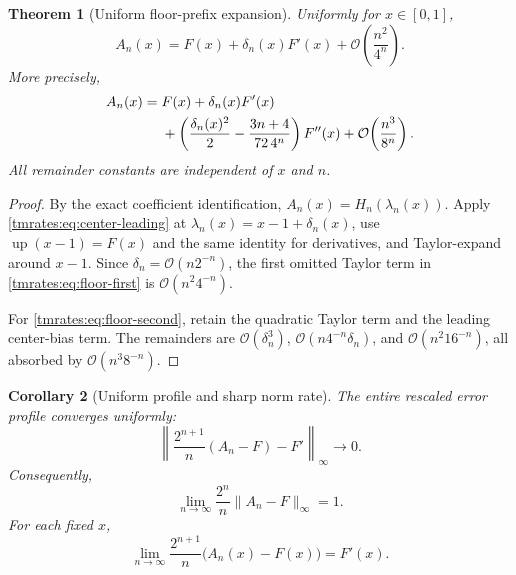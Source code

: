 \documentclass[11pt,oneside]{article}
\newtheorem{theorem}{Theorem}[section]
\newtheorem{corollary}[theorem]{Corollary}
\theoremstyle{definition}
\theoremstyle{remark}
\newcommand{\Up}{\operatorname{up}}
\newcommand{\bigO}{\mathcal O}
\begin{document}
\begin{theorem}[Uniform floor-prefix expansion]
\label{tmrates:thm:floor-expansion}
Uniformly for $x\in[0,1]$,
\begin{equation}
 A_n(x)
 =F(x)+\delta_n(x)F'(x)
  +\bigO\!\left(\frac{n^2}{4^n}\right).                  \label{tmrates:eq:floor-first}
\end{equation}
More precisely,
\begin{align}
 A_n(x)
={}&F(x)+\delta_n(x)F'(x) \notag\\
 &+\left(
    \frac{\delta_n(x)^2}{2}
    -\frac{3n+4}{72\,4^n}
   \right)F''(x)
 +\bigO\!\left(\frac{n^3}{8^n}\right).                  \label{tmrates:eq:floor-second}
\end{align}
All remainder constants are independent of $x$ and $n$.
\end{theorem}

\begin{proof}
By the exact coefficient identification,
$A_n(x)=H_n(\lambda_n(x))$.  Apply \eqref{tmrates:eq:center-leading} at
$\lambda_n(x)=x-1+\delta_n(x)$, use $\Up(x-1)=F(x)$ and the same identity for derivatives,
and Taylor-expand around $x-1$.  Since $\delta_n=\bigO(n2^{-n})$, the first omitted Taylor
term in \eqref{tmrates:eq:floor-first} is $\bigO(n^2 4^{-n})$.

For \eqref{tmrates:eq:floor-second}, retain the quadratic Taylor term and the leading center-bias
term.  The remainders are
$\bigO(\delta_n^3)$, $\bigO(n4^{-n}\delta_n)$, and
$\bigO(n^2 16^{-n})$, all absorbed by $\bigO(n^3 8^{-n})$.
\end{proof}

\begin{corollary}[Uniform profile and sharp norm rate]
\label{tmrates:cor:floor-sharp}
The entire rescaled error profile converges uniformly:
\begin{equation}
 \left\|\frac{2^{n+1}}n(A_n-F)-F'\right\|_\infty
 \longrightarrow0.                                       \label{tmrates:eq:floor-profile}
\end{equation}
Consequently,
\begin{equation}
 \lim_{n\to\infty}\frac{2^n}{n}\|A_n-F\|_\infty=1.       \label{tmrates:eq:floor-sharp}
\end{equation}
For each fixed $x$,
\begin{equation}
 \lim_{n\to\infty}\frac{2^{n+1}}n\bigl(A_n(x)-F(x)\bigr)
 =F'(x).                                                   \label{tmrates:eq:floor-pointwise-profile}
\end{equation}
\end{corollary}
\end{document}

